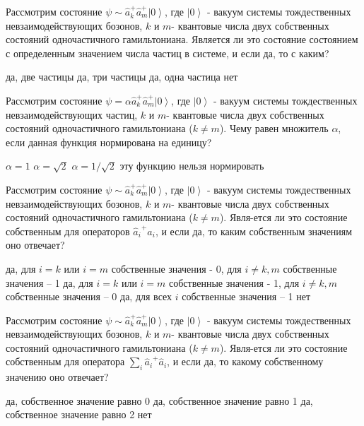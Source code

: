 \documentclass[11pt,a4paper]{exam}
\begin{document}
\begin{questions}
\question Рассмотрим состояние $\psi  \sim \hat a_k^ + \hat a_m^ + \left| 0 \right\rangle $, где $\left| 0 \right\rangle $ - вакуум системы тождественных невзаимодействующих бозонов, $k$ и $m$- квантовые числа двух собственных состояний одночастичного гамильтониана. Является ли это состояние состоянием с определенным значением числа частиц в системе, и если да, то с каким?
\begin{choices}
\choice да, две частицы         
\choice да, три частицы
\choice да, одна частица        
\choice нет
\end{choices}

\question Рассмотрим состояние $\psi  = \alpha \hat a_k^ + \hat a_m^ + \left| 0 \right\rangle $, где $\left| 0 \right\rangle $ - вакуум системы тождественных невзаимодействующих частиц, $k$ и $m$- квантовые числа двух собственных состояний одночастичного гамильтониана ($k \ne m$). Чему равен множитель $\alpha $, если данная функция нормирована на единицу?
\begin{choices}
\choice $\alpha  = 1$            
\choice $\alpha  = \sqrt 2 $
\choice $\alpha  = 1/\sqrt 2 $            
\choice эту функцию нельзя нормировать
\end{choices}

\question Рассмотрим состояние $\psi  \sim \hat a_k^ + \hat a_m^ + \left| 0 \right\rangle $, где $\left| 0 \right\rangle $ - вакуум системы тождественных невзаимодействующих бозонов, $k$ и $m$- квантовые числа двух собственных состояний одночастичного гамильтониана ($k \ne m$). Явля-ется ли это состояние собственным для операторов ${\hat a_i}^ + {\hat a_i}$, и если да, то каким собственным значениям оно отвечает?
\begin{choices}
\choice да, для $i = k$ или $i = m$ собственные значения - 0, для $i \ne k,m$ собственные значения – 1
\choice да, для $i = k$ или $i = m$ собственные значения - 1, для $i \ne k,m$ собственные значения – 0
\choice да, для всех $i$ собственные значения – 1
\choice нет
\end{choices}

\question Рассмотрим состояние $\psi  \sim \hat a_k^ + \hat a_m^ + \left| 0 \right\rangle $, где $\left| 0 \right\rangle $ - вакуум системы тождественных невзаимодействующих бозонов, $k$ и $m$- квантовые числа двух собственных состояний одночастичного гамильтониана ($k \ne m$). Явля-ется ли это состояние собственным для оператора $\sum\limits_i {{{\hat a}_i}^ + {{\hat a}_i}} $, и если да, то какому собственному значению оно отвечает?
\begin{choices}
\choice да, собственное значение равно 0
\choice да, собственное значение равно 1
\choice да, собственное значение равно 2
\choice нет
\end{choices}


\end{questions}
\end{document}
